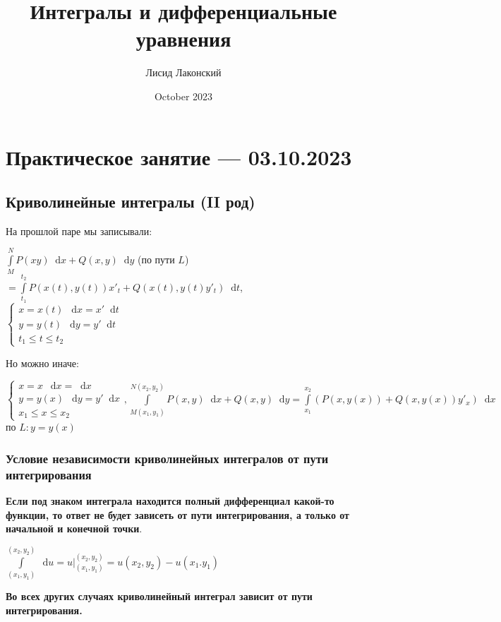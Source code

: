 \documentclass{article}
\title{Интегралы и дифференциальные уравнения}
\author{Лисид Лаконский}
\date{October 2023}
\newcommand*\diff{\mathop{}\!\mathrm{d}}
\begin{document}
\raggedright

\maketitle

\tableofcontents
\pagebreak

\section{Практическое занятие — 03.10.2023}

\subsection{Криволинейные интегралы (II род)}

На прошлой паре мы записывали:

$\int\limits_{M}^{N} P(x y) \diff x + Q(x, y) \diff y$ (по пути $L$) $= \int\limits_{t_1}^{t_2} P(x(t), y(t)) x'_t + Q(x(t), y(t) y'_t) \diff t$, $\begin{cases}
    x = x(t) \ \diff x = x' \diff t \\
    y = y(t) \ \diff y = y' \diff t \\
    t_1 \le t \le t_2
\end{cases}$

Но можно иначе:

$\begin{cases}
    x = x \ \diff x = \diff x \\
    y = y(x) \ \diff y = y' \diff x \\
    x_1 \le x \le x_2
\end{cases}, \int\limits_{M(x_1, y_1)}^{N(x_2, y_2)} P(x, y) \diff x + Q(x, y) \diff y = \int\limits_{x_1}^{x_2} (P(x, y(x)) + Q(x, y(x)) y'_x) \diff x$ по $L: y = y(x)$

\subsubsection{Условие независимости криволинейных интегралов от пути интегрирования}

\textbf{Если под знаком интеграла находится полный дифференциал какой-то функции, то ответ не будет зависеть от пути интегрирования, а только от начальной и конечной точки}.

$\int\limits_{(x_1, y_1)}^{(x_2, y_2)} \diff u = u \bigg|_{(x_1, y_1)}^{(x_2, y_2)} = u(x_2, y_2) - u(x_1. y_1)$

\textbf{Во всех других случаях криволинейный интеграл зависит от пути интегрирования.}
\end{document}
